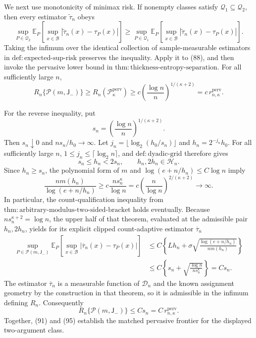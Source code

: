 We next use monotonicity of minimax risk.  If nonempty classes satisfy
\(\mathcal Q_1\subseteq\mathcal Q_2\), then every estimator
\(\widetilde\tau_n\) obeys
\[
 \sup_{P\in\mathcal Q_2}
 \mathbb E_P\!\left[\sup_{x\in\mathcal B}
 |\widetilde\tau_n(x)-\tau_P(x)|\right]
 \ge
 \sup_{P\in\mathcal Q_1}
 \mathbb E_P\!\left[\sup_{x\in\mathcal B}
 |\widetilde\tau_n(x)-\tau_P(x)|\right].
\]
Taking the infimum over the identical collection of sample-measurable
estimators in \(\mathrm{def:expected\text{-}sup\text{-}risk}\) preserves
the inequality.  Apply it to (88), and then invoke the pervasive lower
bound in \(\mathrm{thm:thickness\text{-}entropy\text{-}separation}\).
For all sufficiently large \(n\),
\[
 R_n\{\mathcal P(m,\mathsf J_{-})\}
 \ge R_n(\mathcal P_{\kappa}^{\mathrm{perv}})
 \ge c\left(\frac{\log n}{n}\right)^{1/(\kappa+2)}
 =c\,r_{n,\kappa}^{\mathrm{perv}}. \tag{91}
\]

For the reverse inequality, put
\[
 s_n=\left(\frac{\log n}{n}\right)^{1/(\kappa+2)}.
\]
Then \(s_n\downarrow0\) and \(ns_n/h_0\to\infty\).  Let
\(j_n=\lfloor\log_2(h_0/s_n)\rfloor\) and
\(h_n=2^{-j_n}h_0\).  For all sufficiently large \(n\),
\(1\le j_n\le\lceil\log_2 n\rceil\), and
\(\mathrm{def:dyadic\text{-}grid}\) therefore gives
\[
 s_n\le h_n<2s_n,
 \qquad h_n,2h_n\in\mathcal H_n. \tag{92}
\]
Since \(h_n\ge s_n\), the polynomial form of \(m\) and
\(\log(e+n/h_n)\le C\log n\) imply
\[
 \frac{nm(h_n)}{\log(e+n/h_n)}
 \ge c\frac{ns_n^\kappa}{\log n}
 =c\left(\frac n{\log n}\right)^{2/(\kappa+2)}
 \longrightarrow\infty. \tag{93}
\]
In particular, the count-qualification inequality from
\(\mathrm{thm:arbitrary\text{-}modulus\text{-}two\text{-}sided\text{-}bracket}\)
holds eventually.  Because \(ns_n^{\kappa+2}=\log n\), the upper half of
that theorem, evaluated at the admissible pair \(h_n,2h_n\), yields for
its explicit clipped count-adaptive estimator \(\overline\tau_n\)
\[
 \begin{aligned}
 \sup_{P\in\mathcal P(m,\mathsf J_{-})}
 \mathbb E_P\!\left[\sup_{x\in\mathcal B}
 |\overline\tau_n(x)-\tau_P(x)|\right]
 &\le C\left\{Lh_n+
 \sigma\sqrt{\frac{\log(e+n/h_n)}{nm(h_n)}}\right\}\\
 &\le C\left\{s_n+
 \sqrt{\frac{\log n}{ns_n^\kappa}}\right\}
 =Cs_n.
 \end{aligned} \tag{94}
\]
The estimator \(\overline\tau_n\) is a measurable function of
\(\mathcal D_n\) and the known assignment geometry by the construction in
that theorem, so it is admissible in the infimum defining \(R_n\).
Consequently
\[
 R_n\{\mathcal P(m,\mathsf J_{-})\}
 \le Cs_n
 =C\,r_{n,\kappa}^{\mathrm{perv}}. \tag{95}
\]
Together, (91) and (95) establish the matched pervasive frontier for the
displayed two-argument class.

